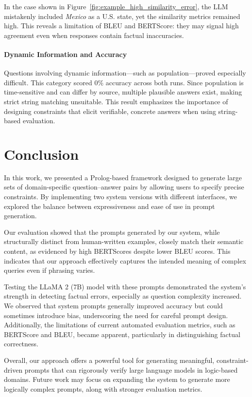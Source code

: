 \documentclass{article}
\begin{document}
In the case shown in Figure~\ref{fig:example_high_similarity_error}, the LLM mistakenly included \emph{Mexico} as a U.S. state, yet the similarity metrics remained high. 
This reveals a limitation of BLEU and BERTScore: they may signal high agreement even when responses contain 
factual inaccuracies.

\paragraph{Dynamic Information and Accuracy}

Questions involving dynamic information—such as population—proved especially difficult. 
This category scored 0\% accuracy across both runs. Since population is time-sensitive and can differ 
by source, multiple plausible answers exist, making strict string matching unsuitable. This result 
emphasizes the importance of designing constraints that elicit verifiable, concrete answers when 
using string-based evaluation.

\section{Conclusion}

In this work, we presented a Prolog-based framework designed to generate large sets of domain-specific question–answer 
pairs by allowing users to specify precise constraints. By implementing two system versions with different interfaces, 
we explored the balance between expressiveness and ease of use in prompt generation.

Our evaluation showed that the prompts generated by our system, while structurally distinct from human-written examples, 
closely match their semantic content, as evidenced by high BERTScores despite lower BLEU scores. This indicates that 
our approach effectively captures the intended meaning of complex queries even if phrasing varies.

Testing the LLaMA 2 (7B) model with these prompts demonstrated the system’s strength in detecting factual errors, 
especially as question complexity increased. We observed that system prompts generally improved accuracy but could 
sometimes introduce bias, underscoring the need for careful prompt design. Additionally, the limitations of current 
automated evaluation metrics, such as BERTScore and BLEU, became apparent, particularly in distinguishing factual 
correctness.

Overall, our approach offers a powerful tool for generating meaningful, constraint-driven prompts that can rigorously 
verify large language models in logic-based domains. Future work may focus on expanding the system to generate more 
logically complex prompts, along with stronger evaluation metrics.

{
\small



}
\end{document}
